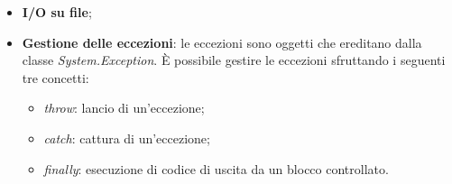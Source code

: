 \begin{solution}
\begin{itemize}
	\item \textbf{I/O su file};
	\item \textbf{Gestione delle eccezioni}: le eccezioni sono oggetti che ereditano dalla classe \textit{System.Exception}.
	\newline
	È possibile gestire le eccezioni sfruttando i seguenti tre concetti:
	\begin{itemize}
		\item \textit{throw}: lancio di un'eccezione;
		\item \textit{catch}: cattura di un'eccezione;
		\item \textit{finally}: esecuzione di codice di uscita da un blocco controllato.
	\end{itemize}
\end{itemize}
\end{solution}

